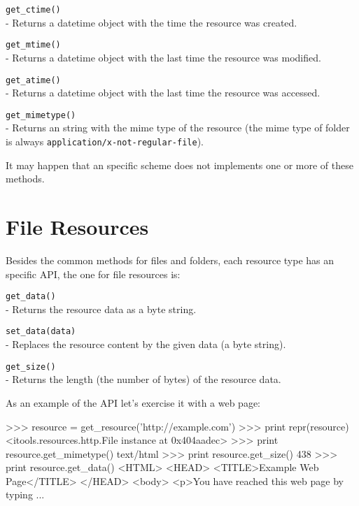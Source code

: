 \begin{api}
  {\tt get\_ctime()}\\
  - Returns a datetime object with the time the resource was created.

  {\tt get\_mtime()}\\
  - Returns a datetime object with the last time the resource was modified.

  {\tt get\_atime()}\\
  - Returns a datetime object with the last time the resource was accessed.

  {\tt get\_mimetype()}\\
  - Returns an string with the mime type of the resource (the mime type of
    folder is always {\tt application/x-not-regular-file}).
\end{api}

It may happen that an specific scheme does not implements one or more of
these methods.

\section{File Resources}

Besides the common methods for files and folders, each resource type has
an specific API, the one for file resources is:

\begin{api}
  {\tt get\_data()}\\
  - Returns the resource data as a byte string.

  {\tt set\_data(data)}\\
  - Replaces the resource content by the given data (a byte string).

  {\tt get\_size()}\\
  - Returns the length (the number of bytes) of the resource data.
\end{api}

As an example of the API let's exercise it with a web page:

\begin{code}
    >>> resource = get_resource('http://example.com')
    >>> print repr(resource)
    <itools.resources.http.File instance at 0x404aadec>
    >>> print resource.get_mimetype()
    text/html
    >>> print resource.get_size()
    438
    >>> print resource.get_data()
    <HTML>
    <HEAD>
      <TITLE>Example Web Page</TITLE>
    </HEAD> 
    <body>  
    <p>You have reached this web page by typing
    ...
\end{code}

